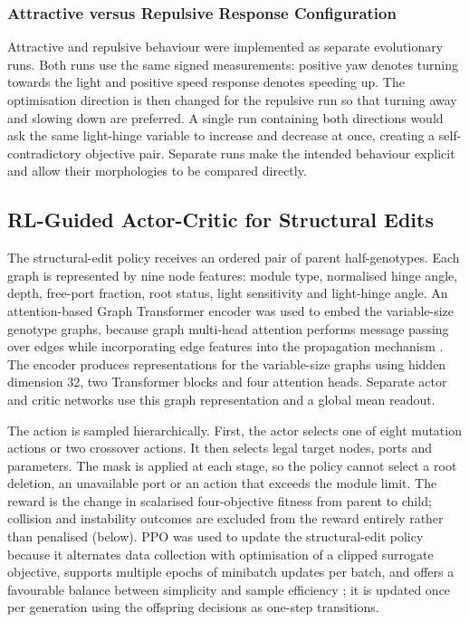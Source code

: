 \documentclass[12pt,a4paper]{report}
\begin{document}
\subsubsection{Attractive versus Repulsive Response Configuration}
Attractive and repulsive behaviour were implemented as separate evolutionary runs. Both runs use the same signed measurements: positive yaw denotes turning towards the light and positive speed response denotes speeding up. The optimisation direction is then changed for the repulsive run so that turning away and slowing down are preferred. A single run containing both directions would ask the same light-hinge variable to increase and decrease at once, creating a self-contradictory objective pair. Separate runs make the intended behaviour explicit and allow their morphologies to be compared directly.

\subsection{RL-Guided Actor-Critic for Structural Edits}
\label{sec:rl-actor-critic}
The structural-edit policy receives an ordered pair of parent half-genotypes. Each graph is represented by nine node features: module type, normalised hinge angle, depth, free-port fraction, root status, light sensitivity and light-hinge angle. An attention-based Graph Transformer encoder was used to embed the variable-size genotype graphs, because graph multi-head attention performs message passing over edges while incorporating edge features into the propagation mechanism \citep{shi2020masked}. The encoder produces representations for the variable-size graphs using hidden dimension 32, two Transformer blocks and four attention heads. Separate actor and critic networks use this graph representation and a global mean readout.

The action is sampled hierarchically. First, the actor selects one of eight mutation actions or two crossover actions. It then selects legal target nodes, ports and parameters. The mask is applied at each stage, so the policy cannot select a root deletion, an unavailable port or an action that exceeds the module limit. The reward is the change in scalarised four-objective fitness from parent to child; collision and instability outcomes are excluded from the reward entirely rather than penalised (below). PPO was used to update the structural-edit policy because it alternates data collection with optimisation of a clipped surrogate objective, supports multiple epochs of minibatch updates per batch, and offers a favourable balance between simplicity and sample efficiency \citep{schulman2017proximal}; it is updated once per generation using the offspring decisions as one-step transitions.
\end{document}

